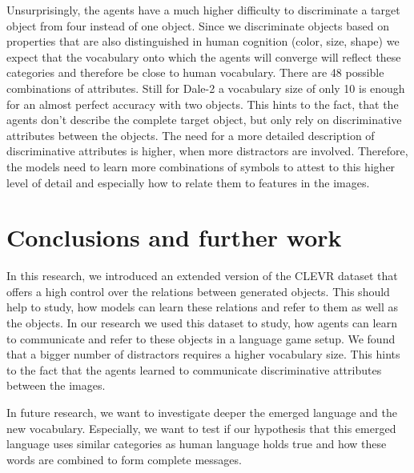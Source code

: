 \documentclass[11pt]{article}
\begin{document}
Unsurprisingly, the agents have a much higher difficulty to discriminate a target object from four instead of one object.
Since we discriminate objects based on properties that are also distinguished in human cognition (color, size, shape) we expect that the vocabulary onto which the agents will converge will reflect these categories and therefore be close to human vocabulary.
There are 48 possible combinations of attributes.
Still for Dale-2 a vocabulary size of only 10 is enough for an almost perfect accuracy with two objects.
This hints to the fact, that the agents don't describe the complete target object, but only rely on discriminative attributes between the objects.
The need for a more detailed description of discriminative attributes is higher, when more distractors are involved.
Therefore, the models need to learn more combinations of symbols to attest to this higher level of detail and especially how to relate them to features in the images.

\section{Conclusions and further work}
In this research, we introduced an extended version of the CLEVR dataset that offers a high control over the relations between generated objects.
This should help to study, how models can learn these relations and refer to them as well as the objects.
In our research we used this dataset to study, how agents can learn to communicate and refer to these objects in a language game setup.
We found that a bigger number of distractors requires a higher vocabulary size.
This hints to the fact that the agents learned to communicate discriminative attributes between the images.

In future research, we want to investigate deeper the emerged language and the new vocabulary.
Especially, we want to test if our hypothesis that this emerged language uses similar categories as human language holds true and how these words are combined to form complete messages.




\appendix
\end{document}
